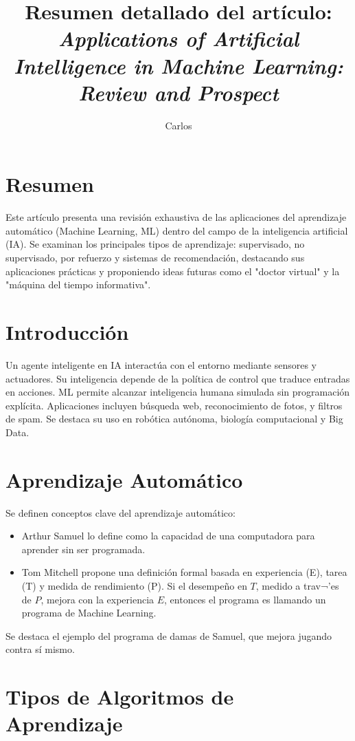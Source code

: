 \documentclass[12pt]{article}
\title{Resumen detallado del art\'iculo:\\
\textit{Applications of Artificial Intelligence in Machine Learning: Review and Prospect}}
\author{Carlos}
\date{}
\begin{document}
\maketitle

\section*{Resumen}
Este art\'iculo presenta una revisi\'on exhaustiva de las aplicaciones del aprendizaje autom\'atico (Machine Learning, ML) dentro del campo de la inteligencia artificial (IA). Se examinan los principales tipos de aprendizaje: supervisado, no supervisado, por refuerzo y sistemas de recomendaci\'on, destacando sus aplicaciones pr\'acticas y proponiendo ideas futuras como el "doctor virtual" y la "m\'aquina del tiempo informativa".

\section{Introducci\'on}
Un agente inteligente en IA interact\'ua con el entorno mediante sensores y actuadores. Su inteligencia depende de la pol\'itica de control que traduce entradas en acciones. ML permite alcanzar inteligencia humana simulada sin programaci\'on expl\'icita. Aplicaciones incluyen b\'usqueda web, reconocimiento de fotos, y filtros de spam. Se destaca su uso en rob\'otica aut\'onoma, biolog\'ia computacional y Big Data.

\section{Aprendizaje Autom\'atico}
Se definen conceptos clave del aprendizaje autom\'atico:
\begin{itemize}
  \item Arthur Samuel lo define como la capacidad de una computadora para aprender sin ser programada.
  \item Tom Mitchell propone una definici\'on formal basada en experiencia (E), tarea (T) y medida de rendimiento (P). Si el desempe\~no en $T$, medido a trav¬'es de $P$, mejora con la experiencia  $E$, entonces el programa es llamando un programa de Machine Learning.
\end{itemize}
Se destaca el ejemplo del programa de damas de Samuel, que mejora jugando contra s\'i mismo.

\section{Tipos de Algoritmos de Aprendizaje}
\end{document}
